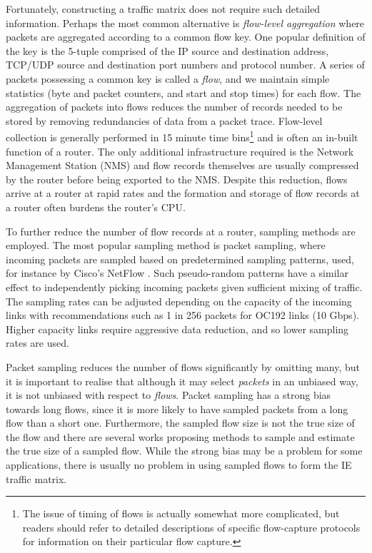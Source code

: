 Fortunately, constructing a traffic matrix does not require such
detailed information. Perhaps the most common alternative is {\em
  flow-level aggregation} where packets are aggregated according to a
common flow key.  One popular definition of the key is the 5-tuple
comprised of the IP source and destination address, TCP/UDP source and
destination port numbers and protocol number. A series of packets
possessing a common key is called a \emph{flow}, and we maintain
simple statistics (byte and packet counters, and start and stop times)
for each flow. The aggregation of packets into flows reduces the
number of records needed to be stored by removing redundancies of data
from a packet trace. Flow-level collection is generally performed in
15 minute time bins\footnote{The issue of timing of flows is actually
  somewhat more complicated, but readers should refer to detailed
  descriptions of specific flow-capture protocols for information on
  their particular flow capture.} and is often an in-built function of
a router. The only additional infrastructure required is the Network
Management Station (NMS) and flow records themselves are usually
compressed by the router before being exported to the NMS. Despite
this reduction, flows arrive at a router at rapid rates and the
formation and storage of flow records at a router often burdens the
router's CPU.

To further reduce the number of flow records at a router, sampling
methods are employed. The most popular sampling method is packet
sampling, where incoming packets are sampled based on predetermined
sampling patterns, used, for instance by Cisco's NetFlow
\cite{NetFlow}. Such pseudo-random patterns have a similar effect to
independently picking incoming packets given sufficient mixing of
traffic.  The sampling rates can be adjusted depending on the capacity
of the incoming links with recommendations such as 1 in 256 packets
for OC192 links (10 Gbps). Higher capacity links require aggressive
data reduction, and so lower sampling rates are used.

Packet sampling reduces the number of flows significantly by omitting
many, but it is important to realise that although it may select
\emph{packets} in an unbiased way, it is not unbiased with respect to
\emph{flows}. Packet sampling has a strong bias towards long flows,
since it is more likely to have sampled packets from a long flow than
a short one. Furthermore, the sampled flow size is not the true size
of the flow and there are several works
\cite{Duffield05Sampled,Duffield05Smart} proposing methods to sample
and estimate the true size of a sampled flow. While the strong bias
may be a problem for some applications, there is usually no problem in
using sampled flows to form the IE traffic matrix.

